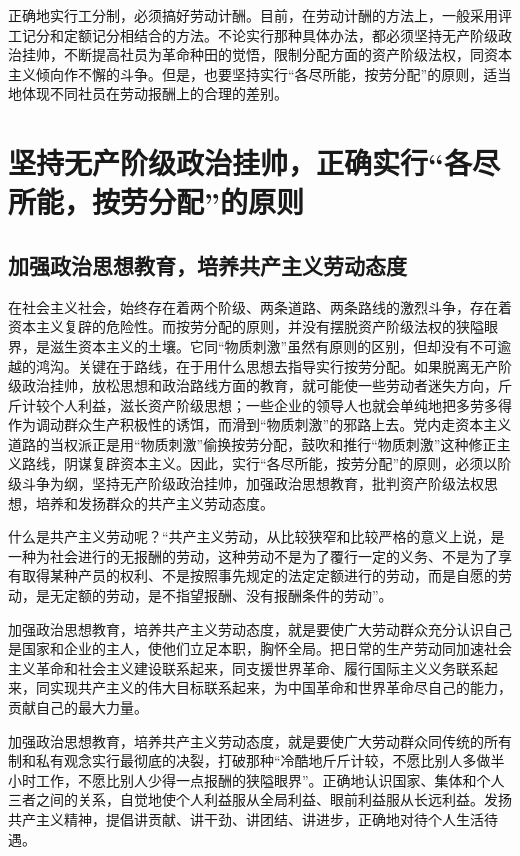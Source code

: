 \documentclass{book}
\begin{document}
正确地实行工分制，必须搞好劳动计酬。目前，在劳动计酬的方法上，一般采用评工记分和定额记分相结合的方法。不论实行那种具体办法，都必须坚持无产阶级政治挂帅，不断提高社员为革命种田的觉悟，限制分配方面的资产阶级法权，同资本主义倾向作不懈的斗争。但是，也要坚持实行“各尽所能，按劳分配”的原则，适当地体现不同社员在劳动报酬上的合理的差别。

\section{坚持无产阶级政治挂帅，正确实行“各尽所能，按劳分配”的原则}

\subsection{加强政治思想教育，培养共产主义劳动态度}

在社会主义社会，始终存在着两个阶级、两条道路、两条路线的激烈斗争，存在着资本主义复辟的危险性。而按劳分配的原则，并没有摆脱资产阶级法权的狭隘眼界，是滋生资本主义的土壤。它同“物质刺激”虽然有原则的区别，但却没有不可逾越的鸿沟。关键在于路线，在于用什么思想去指导实行按劳分配。如果脱离无产阶级政治挂帅，放松思想和政治路线方面的教育，就可能使一些劳动者迷失方向，斤斤计较个人利益，滋长资产阶级思想；一些企业的领导人也就会单纯地把多劳多得作为调动群众生产积极性的诱饵，而滑到“物质刺激”的邪路上去。党内走资本主义道路的当权派正是用“物质刺激”偷换按劳分配，鼓吹和推行“物质刺激”这种修正主义路线，阴谋复辟资本主义。因此，实行“各尽所能，按劳分配”的原则，必须以阶级斗争为纲，坚持无产阶级政治挂帅，加强政治思想教育，批判资产阶级法权思想，培养和发扬群众的共产主义劳动态度。

什么是共产主义劳动呢？“共产主义劳动，从比较狭窄和比较严格的意义上说，是一种为社会进行的无报酬的劳动，这种劳动不是为了覆行一定的义务、不是为了享有取得某种产员的权利、不是按照事先规定的法定定额进行的劳动，而是自愿的劳动，是无定额的劳动，是不指望报酬、没有报酬条件的劳动”。

加强政治思想教育，培养共产主义劳动态度，就是要使广大劳动群众充分认识自己是国家和企业的主人，使他们立足本职，胸怀全局。把日常的生产劳动同加速社会主义革命和社会主义建设联系起来，同支援世界革命、履行国际主义义务联系起来，同实现共产主义的伟大目标联系起来，为中国革命和世界革命尽自己的能力，贡献自己的最大力量。

加强政治思想教育，培养共产主义劳动态度，就是要使广大劳动群众同传统的所有制和私有观念实行最彻底的决裂，打破那种“冷酷地斤斤计较，不愿比别人多做半小时工作，不愿比别人少得一点报酬的狭隘眼界”。正确地认识国家、集体和个人三者之间的关系，自觉地使个人利益服从全局利益、眼前利益服从长远利益。发扬共产主义精神，提倡讲贡献、讲干劲、讲团结、讲进步，正确地对待个人生活待遇。
\end{document}
